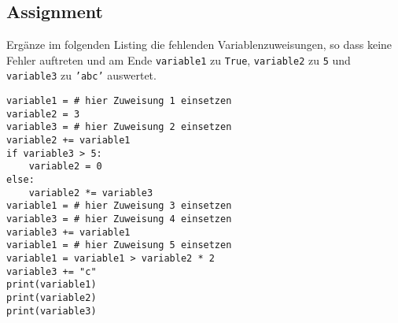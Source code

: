 \subsection{Assignment}
Ergänze im folgenden Listing die fehlenden Variablenzuweisungen, so dass keine Fehler auftreten und am Ende \texttt{variable1} zu \texttt{True}, \texttt{variable2} zu \texttt{5} und \texttt{variable3} zu \texttt{'abc'} auswertet.
\begin{lstlisting}
variable1 = # hier Zuweisung 1 einsetzen
variable2 = 3
variable3 = # hier Zuweisung 2 einsetzen
variable2 += variable1
if variable3 > 5:
	variable2 = 0
else:
	variable2 *= variable3
variable1 = # hier Zuweisung 3 einsetzen
variable3 = # hier Zuweisung 4 einsetzen
variable3 += variable1
variable1 = # hier Zuweisung 5 einsetzen
variable1 = variable1 > variable2 * 2
variable3 += "c"
print(variable1)
print(variable2)
print(variable3)
\end{lstlisting}